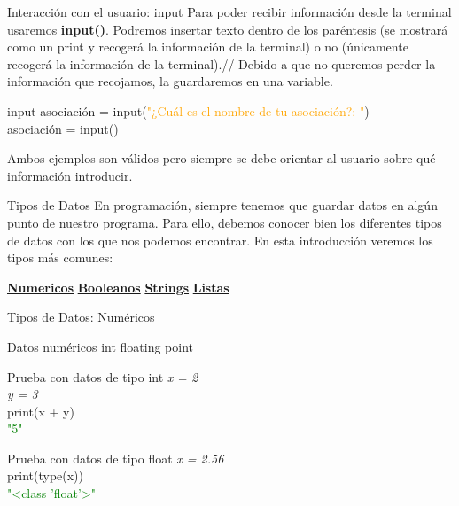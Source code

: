 \documentclass{beamer}
\begin{document}
\begin{frame}{Interacción con el usuario: input}
Para poder recibir información desde la terminal usaremos \textbf{input()}. Podremos insertar texto dentro de los paréntesis (se mostrará como un print y recogerá la información de la terminal) o no (únicamente recogerá la información de la terminal).//
Debido a que no queremos perder la información que recojamos, la guardaremos en una variable.
\begin{Programexample}{input}
asociación = input(\textcolor{orange}{"¿Cuál es el nombre de tu asociación?: "})\\
asociación = input()
\end{Programexample}
Ambos ejemplos son válidos pero siempre se debe orientar al usuario sobre qué información introducir.
\end{frame}

\begin{frame}{Tipos de Datos}
En programación, siempre tenemos que guardar datos en algún punto de nuestro programa. Para ello, debemos conocer bien los diferentes tipos de datos con los que nos podemos encontrar. En esta introducción veremos los tipos más comunes:
\vspace{1cm}

\centering\hyperlink{datos:numericos}{\textbf{Numericos}}
\hspace{1cm} \hyperlink{datos:booleanos}{\textbf{Booleanos}}
\hspace{1cm} \hyperlink{datos:strings}{\textbf{Strings}}
\hspace{1cm} \hyperlink{datos:listas}{\textbf{Listas}}
\end{frame}

\begin{frame} {Tipos de Datos: Numéricos}
\label{datos:numericos}
\begin{block}{Datos numéricos}
int
floating point
\end{block}
\begin{Programexample}{Prueba con datos de tipo int}
\centering
\textit{x = 2}\\
\textit{y = 3}\\
print(x + y)\\
\textcolor{green}{"5"}
\end{Programexample}
\begin{Programexample}{Prueba con datos de tipo float}
\centering\textit{x = 2.56}\\
print(type(x)) \\
\textcolor{green}{"<class 'float'>"}
\end{Programexample}
\end{frame}
\end{document}
